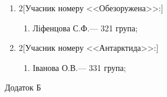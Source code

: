 \documentclass[
	a4paper,
	12pt,
	oneside,
	draft
]{extreport}
\begin{document}
\begin{enumerate}[topsep=0pt,itemsep=-1ex,partopsep=0ex,parsep=1ex]
\item 
\begin{multicols}{2}[Учасник номеру <<Обезоружена>>:] 
\begin{enumerate}[topsep=0pt,itemsep=-1ex,partopsep=0ex,parsep=1ex,label=\arabic*.]
\item Ліфенцова С.Ф.\hfill --- 321 група;
\end{enumerate}
\end{multicols}

\item 
\begin{multicols}{2}[Учасник номеру <<Антарктида>>:] 
\begin{enumerate}[topsep=0pt,itemsep=-1ex,partopsep=0ex,parsep=1ex,label=\arabic*.]
\item Іванова О.В.\hfill --- 331 група;
\end{enumerate}
\end{multicols}


\end{enumerate}
\newpage
\small
\hfill Додаток Б
\end{document}
